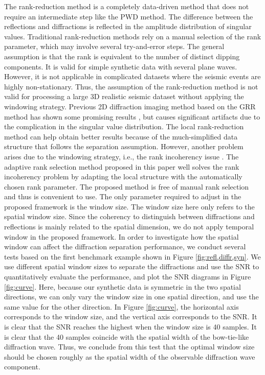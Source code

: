 \documentclass[10pt]{IEEEtran}
\DeclareRobustCommand{\new}[1]{#1}
\begin{document}
The rank-reduction method is a completely data-driven method that does not require an intermediate step like the PWD method. The difference between the reflections and diffractions is reflected in the amplitude distribution of singular values. Traditional rank-reduction methods rely on a manual selection of the rank parameter, which may involve several try-and-error steps. The general assumption is that the rank is equivalent to the number of distinct dipping components. It is valid for simple synthetic data with several plane waves. However, it is not applicable in complicated datasets where the seismic events are highly non-stationary. Thus, the assumption of the rank-reduction method is not valid for processing a large 3D realistic seismic dataset without applying the windowing strategy. Previous 2D diffraction imaging method based on the GRR method has shown some promising results \cite{2020Diffraction}, but causes significant artifacts due to the complication in the singular value distribution. The local rank-reduction method can help obtain better results because of the much-simplified data structure that follows the separation assumption. However, another problem arises due to the windowing strategy, i.e., the rank incoherency issue \cite{shaohuan2017gji,yangkang2017ieee}. The adaptive rank selection method proposed in this paper well solves the rank incoherency problem by adapting the local structure with the automatically chosen rank parameter. The proposed method is free of manual rank selection and thus is convenient to use. The only parameter required to adjust in the proposed framework is the window size. The window size here only refers to the spatial window size. Since the coherency to distinguish between diffractions and reflections is mainly related to the spatial dimension, we do not apply temporal window in the proposed framework. \new{In order to investigate how the spatial window can affect the diffraction separation performance, we conduct several tests based on the first benchmark example shown in Figure \ref{fig:refl,diffr,syn}.  We use different spatial window sizes to separate the diffractions and use the SNR to quantitatively evaluate the performance, and plot the SNR diagrams in Figure \ref{fig:curve}. Here, because our synthetic data is symmetric in the two spatial directions, we can only vary the window size in one spatial direction, and use the same value for the other direction.
In Figure \ref{fig:curve}, the horizontal axis corresponds to the window size, and the vertical axis corresponds to the SNR. It is clear that the SNR reaches the highest when the window size is 40 samples. It is clear that the 40 samples coincide with the spatial width of the bow-tie-like diffraction wave. Thus, we conclude from this test that the optimal window size should be chosen roughly as the spatial width of the observable diffraction wave component. }
\end{document}
